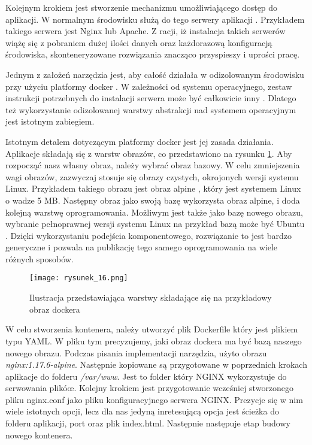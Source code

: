 Kolejnym krokiem jest stworzenie mechanizmu umożliwiającego dostęp do aplikacji. W normalnym środowisku służą do tego serwery aplikacji \cite{web-server}. Przykładem takiego serwera jest Nginx lub Apache.
Z racji, iż instalacja takich serwerów wiążę się z pobraniem dużej ilości danych oraz każdorazową konfiguracją środowiska, skonteneryzowane rozwiązania znacząco przyspieszy i uprości pracę.

Jednym z założeń narzędzia jest, aby całość działała w odizolowanym środowisku przy użyciu platformy docker \cite{docker}. W zależności od systemu operacyjnego, zestaw instrukcji potrzebnych do instalacji serwera może być całkowicie inny \cite{nginx-windows}\cite{nginx-linux}.
Dlatego też wykorzystanie odizolowanej warstwy abstrakcji nad systemem operacyjnym jest istotnym zabiegiem.

Istotnym detalem dotyczącym platformy docker jest jej zasada działania. Aplikacje składają się z warstw obrazów, co przedstawiono na rysunku \ref{fig:rysunek_16}.
Aby rozpocząć nasz własny obraz, należy wybrać obraz bazowy. W celu zmniejszenia wagi obrazów, zazwyczaj stosuje się obrazy czystych, okrojonych wersji systemu Linux.
Przykładem takiego obrazu jest obraz alpine \cite{docker-alpine}, który jest systemem Linux o wadze 5 MB. Następny obraz jako swoją bazę wykorzysta obraz alpine, i doda kolejną warstwę oprogramowania.
Możliwym jest także jako bazę nowego obrazu, wybranie pełnoprawnej wersji systemu Linux na przykład bazą może być Ubuntu \cite{ubuntu}.
Dzięki wykorzystaniu podejścia komponentowego, rozwiązanie to jest bardzo generyczne i pozwala na publikację tego samego oprogramowania na wiele różnych sposobów.

\begin{figure}[htbp]
    \centering
    \texttt{[image: rysunek\_16.png]}
    \caption{Ilustracja przedstawiająca warstwy składające się na  przykładowy obraz dockera}
    \label{fig:rysunek_16}
\end{figure}

W celu stworzenia kontenera, należy utworzyć plik Dockerfile który jest plikiem typu YAML. W pliku tym precyzujemy, jaki obraz dockera ma być bazą naszego nowego obrazu.
Podczas pisania implementacji narzędzia, użyto obrazu \emph{nginx:1.17.6-alpine}. Następnie kopiowane są przygotowane w poprzednich krokach aplikacje do folderu \emph{/var/www}.
Jest to folder który NGINX wykorzystuje do serwowania plikóœ. Kolejny krokiem jest przygotowanie wcześniej stworzonego pliku nginx.conf jako pliku konfiguracyjnego serwera NGINX.
Prezycje się w nim wiele istotnych opcji, lecz dla nas jedyną inretesującą opcja jest ścieżka do folderu aplikacji, port oraz plik index.html. Następnie następuje etap budowy nowego kontenera.

